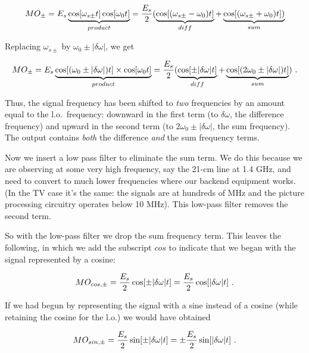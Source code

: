 \documentclass[11pt,preprint]{aastex}
\begin{document}
\begin{mathletters}
\begin{equation}
MO_{\pm} = E_s \underbrace{\cos [\omega_{s \pm} t] \cos [\omega_0 t]
}_{product} =
        {E_s \over 2} (\underbrace {\cos [(\omega_{s\pm} - \omega_0)t
	]}_{diff} +
        \underbrace { \cos [(\omega_{s\pm} + \omega_0)t]) }_{sum}
\end{equation}

\noindent Replacing $\omega_{s\pm}$ by $\omega_0 \pm |\delta \omega|$,
we get


\begin{equation} \label{mopm}
MO_{\pm} = E_s \underbrace{\cos [(\omega_0 \pm |\delta \omega |)t]
\times
\cos [\omega_0 t]}_{product} = {E_s \over 2}
        (\underbrace{ \cos [\pm|\delta \omega | t]}_{diff} +
        \underbrace{ \cos[(2\omega_0 \pm |\delta \omega |) t]}_{sum} ) \
.
\end{equation}
\end{mathletters}

\noindent Thus, the signal frequency has been shifted to {\it two}
frequencies by an amount equal to the l.o.\ frequency:  downward in the
first term (to $\delta \omega $, the difference frequency) and upward
in the second term (to $2\omega_0 \pm |\delta \omega |$, the sum
frequency).  The output contains {\it both} the difference {\it and} the
sum frequency terms.

        Now we insert a low pass filter to eliminate the sum term. We do
this because we are observing at some very high frequency, say the 21-cm
line at 1.4 GHz, and need to convert to much lower frequencies where our
backend equipment works. (In the TV case it's the same: the signals are
at hundreds of MHz and the picture processing circuitry operates below
10 MHz). This low-pass filter removes the second term.

        So with the low-pass filter we drop the sum frequency term. This
leaves the following, in which we add the subscript $cos$ to indicate
that we began with the signal represented by a cosine:

\begin{mathletters} \label{baseband}
\begin{equation}
MO_{cos,\pm} = {E_s \over 2} \cos [\pm|\delta \omega | t] = {E_s \over
  2}
   \cos [|\delta \omega | t] \ .
\end{equation}

\noindent If we had begun by representing the signal with a sine instead
of a cosine (while retaining the cosine for the l.o.) we would have
obtained

\begin{equation}
MO_{sin,\pm} = {E_s \over 2} \sin [\pm|\delta \omega | t] = \pm {E_s
  \over 2}
   \sin [|\delta \omega | t] \ .
\end{equation}
\end{mathletters}
\end{document}
